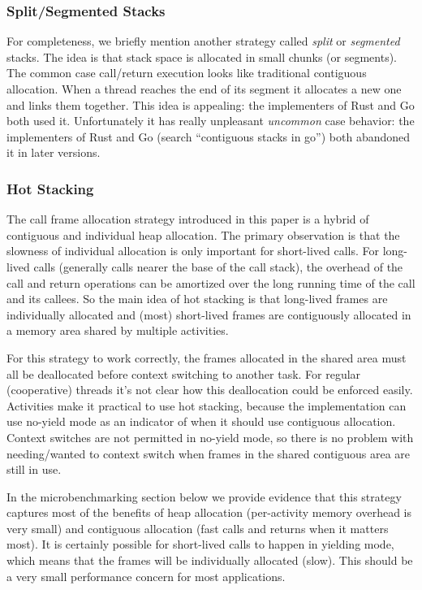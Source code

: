 \documentclass[10pt,preprint]{sigplanconf}
\begin{document}
\subsubsection{Split/Segmented Stacks}

For completeness, we briefly mention another strategy called \emph{split} or \emph{segmented} stacks.
The idea is that stack space is allocated in small chunks (or segments).
The common case call/return execution looks like traditional contiguous allocation.
When a thread reaches the end of its segment it allocates a new one and links them together.
This idea is appealing: the implementers of Rust and Go both used it.
Unfortunately it has really unpleasant \emph{uncommon} case behavior: the implementers of Rust \cite{Anderson2013} and Go (search ``contiguous stacks in go'') both abandoned it in later versions.

\subsubsection{Hot Stacking}

The call frame allocation strategy introduced in this paper is a hybrid of contiguous and individual heap allocation.
The primary observation is that the slowness of individual allocation is only important for short-lived calls.
For long-lived calls (generally calls nearer the base of the call stack), the overhead of the call and return operations can be amortized over the long running time of the call and its callees.
So the main idea of hot stacking is that long-lived frames are individually allocated and (most) short-lived frames are contiguously allocated in a memory area shared by multiple activities.

For this strategy to work correctly, the frames allocated in the shared area must all be deallocated before context switching to another task.
For regular (cooperative) threads it's not clear how this deallocation could be enforced easily.
Activities make it practical to use hot stacking, because the implementation can use no-yield mode as an indicator of when it should use contiguous allocation.
Context switches are not permitted in no-yield mode, so there is no problem with needing/wanted to context switch when frames in the shared contiguous area are still in use.

In the microbenchmarking section below we provide evidence that this strategy captures most of the benefits of heap allocation (per-activity memory overhead is very small) and contiguous allocation (fast calls and returns when it matters most).
It is certainly possible for short-lived calls to happen in yielding mode, which means that the frames will be individually allocated (slow).
This should be a very small performance concern for most applications.
\end{document}

